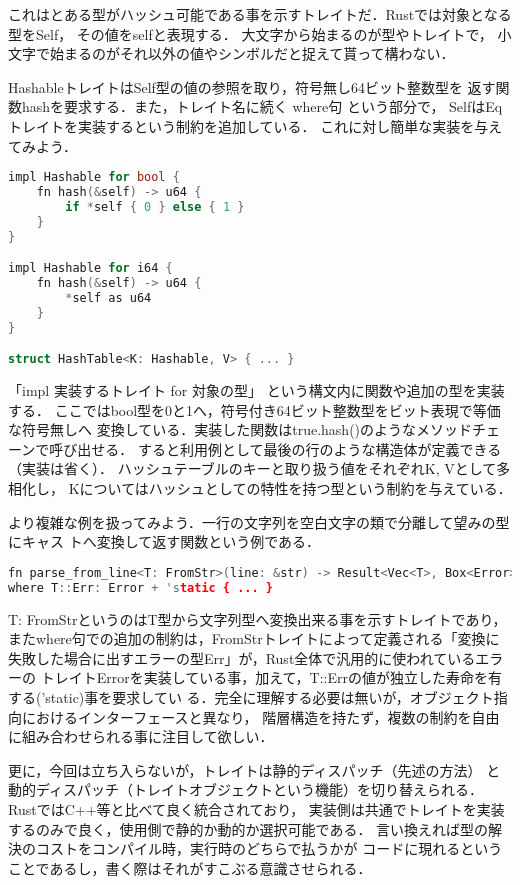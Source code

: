 これはとある型がハッシュ可能である事を示すトレイトだ．Rustでは対象となる型をSelf，
その値をselfと表現する．
大文字から始まるのが型やトレイトで，
小文字で始まるのがそれ以外の値やシンボルだと捉えて貰って構わない．

HashableトレイトはSelf型の値の参照を取り，符号無し64ビット整数型を
返す関数hashを要求する．また，トレイト名に続く where句 という部分で，
SelfはEqトレイトを実装するという制約を追加している．
これに対し簡単な実装を与えてみよう．

\begin{lstlisting}[language={C++},caption=トレイトの実装と利用例,label=hash_use]
impl Hashable for bool {
    fn hash(&self) -> u64 {
        if *self { 0 } else { 1 }
    }
}

impl Hashable for i64 {
    fn hash(&self) -> u64 {
        *self as u64
    }
}

struct HashTable<K: Hashable, V> { ... }
\end{lstlisting}

「impl 実装するトレイト for 対象の型」 という構文内に関数や追加の型を実装する．
ここではbool型を0と1へ，符号付き64ビット整数型をビット表現で等価な符号無しへ
変換している．実装した関数はtrue.hash()のようなメソッドチェーンで呼び出せる．
すると利用例として最後の行のような構造体が定義できる（実装は省く）．
ハッシュテーブルのキーと取り扱う値をそれぞれK, Vとして多相化し，
Kについてはハッシュとしての特性を持つ型という制約を与えている．

より複雑な例を扱ってみよう．一行の文字列を空白文字の類で分離して望みの型にキャス
トへ変換して返す関数という例である．

\begin{lstlisting}[language={C++},caption=トレイトの複合, label=trait_cmpl]
fn parse_from_line<T: FromStr>(line: &str) -> Result<Vec<T>, Box<Error>>
where T::Err: Error + 'static { ... }
\end{lstlisting}

T: FromStrというのはT型から文字列型へ変換出来る事を示すトレイトであり，
またwhere句での追加の制約は，FromStrトレイトによって定義される「変換に
失敗した場合に出すエラーの型Err」が，Rust全体で汎用的に使われているエラーの
トレイトErrorを実装している事，加えて，T::Errの値が独立した寿命を有する('static)事を要求してい
る．完全に理解する必要は無いが，オブジェクト指向におけるインターフェースと異なり，
階層構造を持たず，複数の制約を自由に組み合わせられる事に注目して欲しい．

更に，今回は立ち入らないが，トレイトは静的ディスパッチ（先述の方法）
と動的ディスパッチ（トレイトオブジェクトという機能）を切り替えられる．
RustではC++等と比べて良く統合されており，
実装側は共通でトレイトを実装するのみで良く，使用側で静的か動的か選択可能である．
言い換えれば型の解決のコストをコンパイル時，実行時のどちらで払うかが
コードに現れるということであるし，書く際はそれがすこぶる意識させられる．


